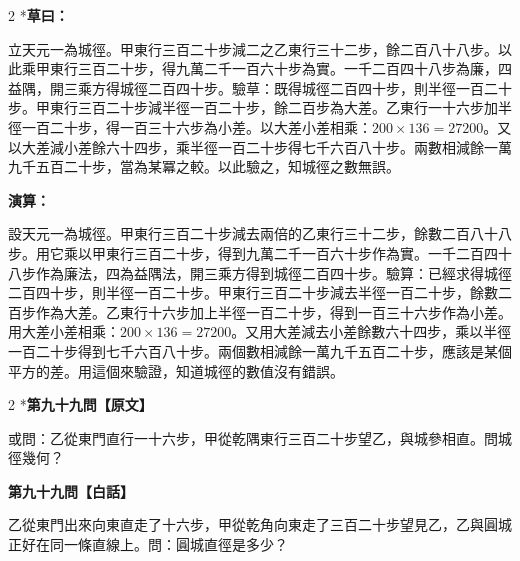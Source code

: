 \documentclass[11pt,a4paper]{article}
\begin{document}
\vspace{0.1cm}
\noindent{}
\par\vspace{0.15cm}

\begin{paracol}{2}
\switchcolumn[0]*\textbf{草曰：}

\small 立天元一為城徑。甲東行三百二十步減二之乙東行三十二步，餘二百八十八步。以此乘甲東行三百二十步，得九萬二千一百六十步為實。一千二百四十八步為廉，四益隅，開三乘方得城徑二百四十步。驗草：既得城徑二百四十步，則半徑一百二十步。甲東行三百二十步減半徑一百二十步，餘二百步為大差。乙東行一十六步加半徑一百二十步，得一百三十六步為小差。以大差小差相乘：$200 \times 136 = 27200$。又以大差減小差餘六十四步，乘半徑一百二十步得七千六百八十步。兩數相減餘一萬九千五百二十步，當為某冪之較。以此驗之，知城徑之數無誤。

\switchcolumn\textbf{演算：}

\small 設天元一為城徑。甲東行三百二十步減去兩倍的乙東行三十二步，餘數二百八十八步。用它乘以甲東行三百二十步，得到九萬二千一百六十步作為實。一千二百四十八步作為廉法，四為益隅法，開三乘方得到城徑二百四十步。驗算：已經求得城徑二百四十步，則半徑一百二十步。甲東行三百二十步減去半徑一百二十步，餘數二百步作為大差。乙東行十六步加上半徑一百二十步，得到一百三十六步作為小差。用大差小差相乘：$200 \times 136 = 27200$。又用大差減去小差餘數六十四步，乘以半徑一百二十步得到七千六百八十步。兩個數相減餘一萬九千五百二十步，應該是某個平方的差。用這個來驗證，知道城徑的數值沒有錯誤。
\end{paracol}

\vspace{0.1cm}
\noindent{}
\par\vspace{0.3cm}

\begin{paracol}{2}
\switchcolumn[0]*\noindent\textbf{第九十九問【原文】}

\small 或問：乙從東門直行一十六步，甲從乾隅東行三百二十步望乙，與城參相直。問城徑幾何？

\switchcolumn\noindent\textbf{第九十九問【白話】}

\small 乙從東門出來向東直走了十六步，甲從乾角向東走了三百二十步望見乙，乙與圓城正好在同一條直線上。問：圓城直徑是多少？
\end{paracol}
\end{document}
